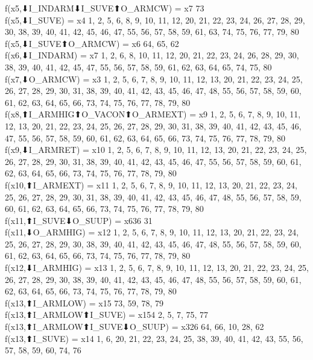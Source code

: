 f(x5,⬇I_INDARM⬇I_SUVE⬆O_ARMCW) = x7 {73} \\
f(x5,⬇I_SUVE) = x4 {1, 2, 5, 6, 8, 9, 10, 11, 12, 20, 21, 22, 23, 24, 26, 27, 28, 29, 30, 38, 39, 40, 41, 42, 45, 46, 47, 55, 56, 57, 58, 59, 61, 63, 74, 75, 76, 77, 79, 80} \\
f(x5,⬇I_SUVE⬆O_ARMCW) = x6 {64, 65, 62} \\
f(x6,⬇I_INDARM) = x7 {1, 2, 6, 8, 10, 11, 12, 20, 21, 22, 23, 24, 26, 28, 29, 30, 38, 39, 40, 41, 42, 45, 47, 55, 56, 57, 58, 59, 61, 62, 63, 64, 65, 74, 75, 80} \\
f(x7,⬇O_ARMCW) = x3 {1, 2, 5, 6, 7, 8, 9, 10, 11, 12, 13, 20, 21, 22, 23, 24, 25, 26, 27, 28, 29, 30, 31, 38, 39, 40, 41, 42, 43, 45, 46, 47, 48, 55, 56, 57, 58, 59, 60, 61, 62, 63, 64, 65, 66, 73, 74, 75, 76, 77, 78, 79, 80} \\
f(x8,⬆I_ARMHIG⬆O_VACON⬆O_ARMEXT) = x9 {1, 2, 5, 6, 7, 8, 9, 10, 11, 12, 13, 20, 21, 22, 23, 24, 25, 26, 27, 28, 29, 30, 31, 38, 39, 40, 41, 42, 43, 45, 46, 47, 55, 56, 57, 58, 59, 60, 61, 62, 63, 64, 65, 66, 73, 74, 75, 76, 77, 78, 79, 80} \\
f(x9,⬇I_ARMRET) = x10 {1, 2, 5, 6, 7, 8, 9, 10, 11, 12, 13, 20, 21, 22, 23, 24, 25, 26, 27, 28, 29, 30, 31, 38, 39, 40, 41, 42, 43, 45, 46, 47, 55, 56, 57, 58, 59, 60, 61, 62, 63, 64, 65, 66, 73, 74, 75, 76, 77, 78, 79, 80} \\
f(x10,⬆I_ARMEXT) = x11 {1, 2, 5, 6, 7, 8, 9, 10, 11, 12, 13, 20, 21, 22, 23, 24, 25, 26, 27, 28, 29, 30, 31, 38, 39, 40, 41, 42, 43, 45, 46, 47, 48, 55, 56, 57, 58, 59, 60, 61, 62, 63, 64, 65, 66, 73, 74, 75, 76, 77, 78, 79, 80} \\
f(x11,⬆I_SUVE⬇O_SUUP) = x636 {31} \\
f(x11,⬇O_ARMHIG) = x12 {1, 2, 5, 6, 7, 8, 9, 10, 11, 12, 13, 20, 21, 22, 23, 24, 25, 26, 27, 28, 29, 30, 38, 39, 40, 41, 42, 43, 45, 46, 47, 48, 55, 56, 57, 58, 59, 60, 61, 62, 63, 64, 65, 66, 73, 74, 75, 76, 77, 78, 79, 80} \\
f(x12,⬇I_ARMHIG) = x13 {1, 2, 5, 6, 7, 8, 9, 10, 11, 12, 13, 20, 21, 22, 23, 24, 25, 26, 27, 28, 29, 30, 38, 39, 40, 41, 42, 43, 45, 46, 47, 48, 55, 56, 57, 58, 59, 60, 61, 62, 63, 64, 65, 66, 73, 74, 75, 76, 77, 78, 79, 80} \\
f(x13,⬆I_ARMLOW) = x15 {73, 59, 78, 79} \\
f(x13,⬆I_ARMLOW⬆I_SUVE) = x154 {2, 5, 7, 75, 77} \\
f(x13,⬆I_ARMLOW⬆I_SUVE⬇O_SUUP) = x326 {64, 66, 10, 28, 62} \\
f(x13,⬆I_SUVE) = x14 {1, 6, 20, 21, 22, 23, 24, 25, 38, 39, 40, 41, 42, 43, 55, 56, 57, 58, 59, 60, 74, 76} \\

